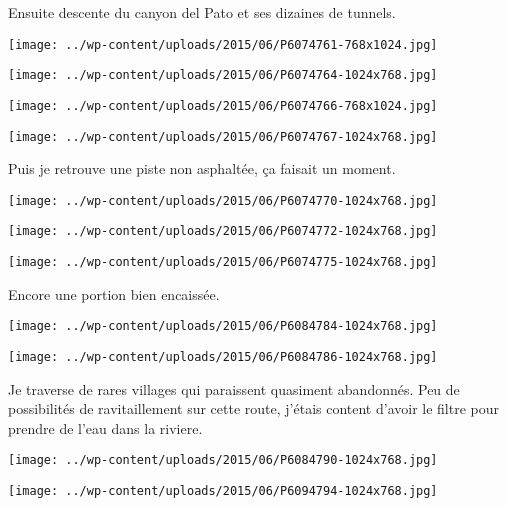 Ensuite descente du canyon del Pato et ses dizaines de tunnels. 
\begin{center} \texttt{[image: ../wp-content/uploads/2015/06/P6074761-768x1024.jpg]} \end{center}
\begin{center} \texttt{[image: ../wp-content/uploads/2015/06/P6074764-1024x768.jpg]} \end{center}
\begin{center} \texttt{[image: ../wp-content/uploads/2015/06/P6074766-768x1024.jpg]} \end{center}
\begin{center} \texttt{[image: ../wp-content/uploads/2015/06/P6074767-1024x768.jpg]} \end{center}

Puis je retrouve une piste non asphaltée, ça faisait un moment. 
\begin{center} \texttt{[image: ../wp-content/uploads/2015/06/P6074770-1024x768.jpg]} \end{center}
\begin{center} \texttt{[image: ../wp-content/uploads/2015/06/P6074772-1024x768.jpg]} \end{center}
\begin{center} \texttt{[image: ../wp-content/uploads/2015/06/P6074775-1024x768.jpg]} \end{center}
\pagebreak

Encore une portion bien encaissée. 
\begin{center} \texttt{[image: ../wp-content/uploads/2015/06/P6084784-1024x768.jpg]} \end{center}
\begin{center} \texttt{[image: ../wp-content/uploads/2015/06/P6084786-1024x768.jpg]} \end{center}
\pagebreak

Je traverse de rares villages qui paraissent quasiment abandonnés. Peu de possibilités de ravitaillement sur cette route, j'étais content d'avoir le filtre pour prendre de l'eau dans la riviere. 
\begin{center} \texttt{[image: ../wp-content/uploads/2015/06/P6084790-1024x768.jpg]} \end{center}
\begin{center} \texttt{[image: ../wp-content/uploads/2015/06/P6094794-1024x768.jpg]} \end{center}
\pagebreak

